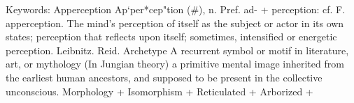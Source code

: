 Keywords:
Apperception
Ap`per*cep"tion (#), n. Pref. ad- + perception: cf. F. apperception. The mind's perception of itself as the subject or actor in its own states; perception that reflects upon itself; sometimes, intensified or energetic perception. Leibnitz. Reid.
Archetype
A recurrent symbol or motif in literature, art, or mythology
(In Jungian theory) a primitive mental image inherited from the earliest human ancestors, and supposed to be present in the collective unconscious.
Morphology
+
Isomorphism
+
Reticulated
+
Arborized
+

